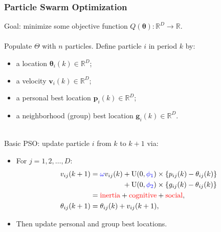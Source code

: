 \documentclass[xcolor=dvipsnames]{beamer}
\begin{document}
\begin{frame}
\frametitle{Particle Swarm Optimization}
Goal: minimize some objective function $Q(\bm{\theta}): \mathbb{R}^D \to \mathbb{R}$.\\~\\
Populate $\Theta$ with $n$ particles. Define particle $i$ in period $k$ by:
\begin{itemize}
\item a {\color{red}location} \hfill $\bm{\theta}_i(k)\in \mathbb{R}^D$;\hspace{2.5cm}\phantom{.}
\item a {\color{red}velocity} \hfill $\bm{v}_i(k) \in \mathbb{R}^D$;\hspace{2.5cm}\phantom{.}
\item a {\color{red}personal best} location \hfill $\bm{p}_i(k) \in \mathbb{R}^D$;\hspace{2.5cm}\phantom{.} 
\item a {\color{red}neighborhood (group) best} location \hfill $\bm{g}_i(k) \in \mathbb{R}^D$.\hspace{2.5cm}\phantom{.} \\~\\
\end{itemize}

\pause 

Basic PSO: update particle $i$ from $k$ to $k+1$ via: \\
\begin{itemize}
\item  For $j=1,2,\dots,D$:
\begin{align*}
v_{ij}(k+1) &= {\color{blue}\omega} v_{ij}(k) +  \mathrm{U}(0,{\color{blue}\phi_1})\times\{p_{ij}(k) - \theta_{ij}(k)\} \\
     &\;\phantom{= \omega v_{ij}(k)}+  \mathrm{U}(0,{\color{blue}\phi_2})\times\{g_{ij}(k) - \theta_{ij}(k)\}\\
& = \mbox{{\color{red}inertia}} + \mbox{{\color{red}cognitive}} + \mbox{{\color{red}social}},\\
\theta_{ij}(k+1) &= \theta_{ij}(k) + v_{ij}(k+1),
\end{align*}
\item Then update personal and group best locations.
\end{itemize}
\end{frame}
\end{document}

